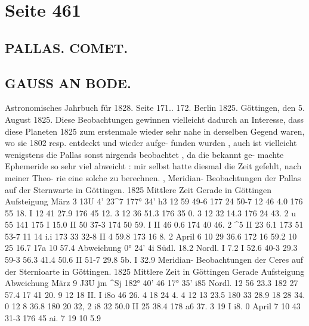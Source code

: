 \documentclass[10pt,a4paper]{article}
\begin{document}
\newpage
\section*{Seite 461}

\subsection*{PALLAS.    COMET.}

\subsection*{GAUSS  AN  BODE.}

Astronomisches  Jahrbuch  für  1828.     Seite  171..  172.     Berlin  1825.
Göttingen,  den  5.  August  1825.
Diese  Beobachtungen  gewinnen  vielleicht  dadurch  an  Interesse,  dass  diese  Planeten  1825  zum
erstenmale  wieder  sehr  nahe  in  derselben  Gegend  waren,  wo  sie  1802  resp.  entdeckt  und  wieder  aufge-
funden wurden ,  auch  ist  vielleicht  wenigstens  die  Pallas  sonst  nirgends  beobachtet ,  da  die  bekannt  ge-
machte Ephemeride  so  sehr  viel  abweicht :  mir  selbst  hatte  diesmal  die  Zeit  gefehlt,  nach  meiner  Theo-
rie eine  solche  zu  berechnen.
,  Meridian- Beobachtungen  der  Pallas  auf  der  Sternwarte  in  Göttingen.
1825
Mittlere  Zeit
Gerade
in  Göttingen
Aufsteigung
März    3
13U    4'\glqq{}  23\textasciicircum{}7
177°  34'    h\glqq{}3
12     59     49-6
177     24    50-7
12     46       4.0
176     55     18. I
12     41     27.9
176     45     12. 3
12     36     51.3
176     35       0. 3
12     32     14.3
176     24    43. 2
u     55     141
175       I     15.0
II     50     37-3
174    50    59. I
II     46       0.6
174    40     46. 2
\textasciicircum{}5
II     23       6.1
173     51     53-7
11     14       i.i
173     33     32-8
II       4     59.8
173     16       8. 2
April  6
10     29     36.6
172     16     59.2
10     25     16.7
17a     10     57.4
Abweichung
0°
24'
4\glqq{}i
Südl.
18.2
Nordl.
I
7.2
I
52.6
40-3
29.3
59-3
56.3
41.4
50.6
II
51-7
29.8
5b.  I
32.9
Meridian- Beobachtungen  der   Ceres  auf  der  Sternioarte  in  Göttingen.
1825
Mittlere  Zeit
in  Göttingen
Gerade
Aufsteigung
Abweichung
März    9
J3U      jm     \textasciicircum{}Sj
182°  40'     4\glqq{}6
17°  35'    i8\glqq{}5  Nordl.
12    56    23.3
182     27     57.4
17     41     20. 9
12     18     II. I
i8o     46     26. 4
18     24      4. 4
12     13     23.5
180     33     28.9
18     28     34. 0
12       8     36.8
180     20     32, 2
i8     32     50.0
II     25     38.4
178     a6     37. 3
19       I     i8. 0
April  7
10     43     31-3
176    45     ai.  7
19     10       5.9
\end{document}
